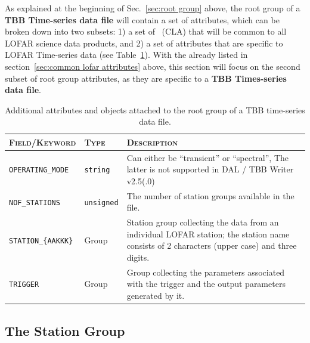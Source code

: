 \documentclass[a4paper,10pt,bibtotoc]{scrartcl}
\begin{document}
As explained at the beginning of Sec.~\ref{sec:root group} above, the
root group of a \textbf{TBB Time-series data file} will contain a set
of attributes, which can be broken down into two subsets: 1) a set of
\cla\ (CLA) that will be common to all LOFAR science data products,
and 2) a set of attributes that are specific to LOFAR Time-series data
(see Table~\ref{tab:hdf5 root group}). With the {\cla} already listed
in section~\ref{sec:common lofar attributes} above, this section will
focus on the second subset of root group attributes, as they are
specific to a \textbf{TBB Times-series data file}.

\begin{table}[htbp]
  \centering
  \begin{tabular}{|llp{9cm}|}
    \hline
    \textsc{Field/Keyword} & \textsc{Type} & \textsc{Description} \\
    \hline
    \hline
    \verb|OPERATING_MODE| & \verb|string| & Can either be ``transient'' or
    ``spectral'', The latter is not supported in DAL / TBB Writer v2.5(.0) \\
    \verb|NOF_STATIONS| & \verb|unsigned| &  The number of station groups
    available in the file.\\
    \verb|STATION_{AAKKK}| & Group & Station group collecting the data
    from an individual LOFAR station; the station name consists of 2
    characters (upper case) and three digits.\\
    \verb|TRIGGER| & Group & Group collecting the
    parameters associated with the trigger and the output
    parameters generated by it. \\
    \hline
  \end{tabular}
  \caption{Additional attributes and objects attached to the root
    group of a TBB time-series data file.}
  \label{tab:hdf5 root group}
\end{table}

\clearpage


\subsection{The Station Group}
\label{sec:station group}
\end{document}
